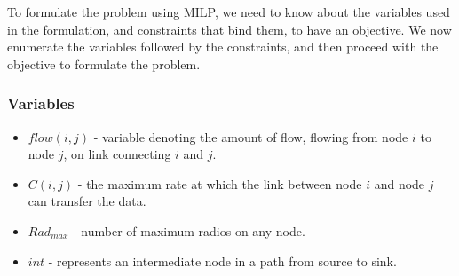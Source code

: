 \documentclass[conference]{IEEEtran}
\begin{document}
To formulate the problem using MILP, we need to know  about the variables used in the formulation, and constraints that bind them, to have an objective.
We now enumerate the variables followed by the constraints, and then proceed with the objective to formulate the problem.


\subsubsection{Variables}
  \begin{itemize}
      \item $flow(i,j)$ - variable denoting the amount of flow, flowing from node $i$ to node $j$, on link connecting $i$ and $j$.
      \item $C(i,j)$ - the maximum rate at which the link between node $i$ and node $j$ can transfer the data.
      \item $Rad_{max}$ - number of maximum radios on any node.
      \item $int$ - represents an intermediate node in a path from source to sink.
      
 \end{itemize}
\end{document}
